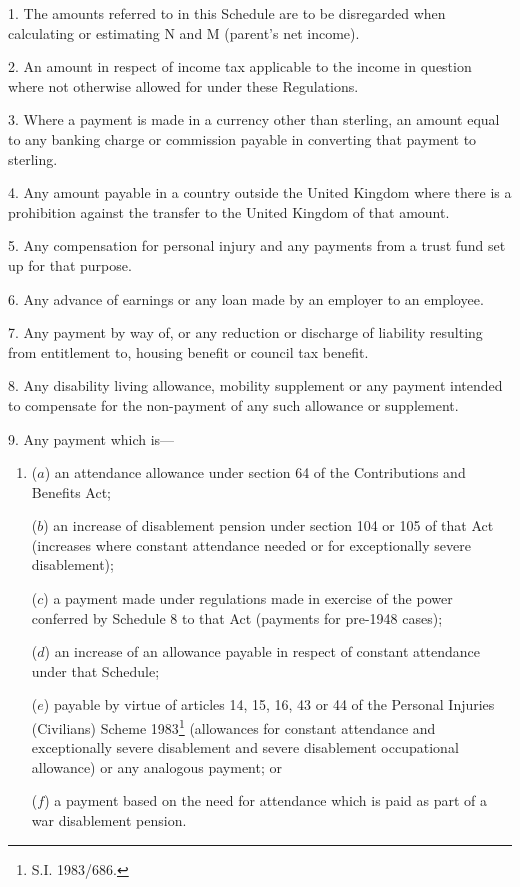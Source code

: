 \documentclass[a4paper]{article}
\newcommand{\parthead}{}
\begin{document}
\renewcommand\parthead{--- Schedule 2}

1.  The amounts referred to in this Schedule are to be disregarded when calculating or estimating N and M (parent’s net income).

\medskip

2.  An amount in respect of income tax applicable to the income in question where not otherwise allowed for under these Regulations.

\medskip

3.  Where a payment is made in a currency other than sterling, an amount equal to any banking charge or commission payable in converting that payment to sterling.

\medskip

4.  Any amount payable in a country outside the United Kingdom where there is a prohibition against the transfer to the United Kingdom of that amount.

\medskip

5.  Any compensation for personal injury and any payments from a trust fund set up for that purpose.

\medskip

6.  Any advance of earnings or any loan made by an employer to an employee.

\medskip

7.  Any payment by way of, or any reduction or discharge of liability resulting from entitlement to, housing benefit or council tax benefit.

\medskip

8.  Any disability living allowance, mobility supplement or any payment intended to compensate for the non-payment of any such allowance or supplement.

\medskip

9.  Any payment which is—
\begin{enumerate}\item[]
($a$) an attendance allowance under section 64 of the Contributions and Benefits Act;

($b$) an increase of disablement pension under section 104 or 105 of that Act (increases where constant attendance needed or for exceptionally severe disablement);

($c$) a payment made under regulations made in exercise of the power conferred by Schedule 8 to that Act (payments for pre-1948 cases);

($d$) an increase of an allowance payable in respect of constant attendance under that Schedule;

($e$) payable by virtue of articles 14, 15, 16, 43 or 44 of the Personal Injuries (Civilians) Scheme 1983\footnote{\frenchspacing S.I. 1983/686.} (allowances for constant attendance and exceptionally severe disablement and severe disablement occupational allowance) or any analogous payment; or

($f$) a payment based on the need for attendance which is paid as part of a war disablement pension.
\end{enumerate}
\end{document}
